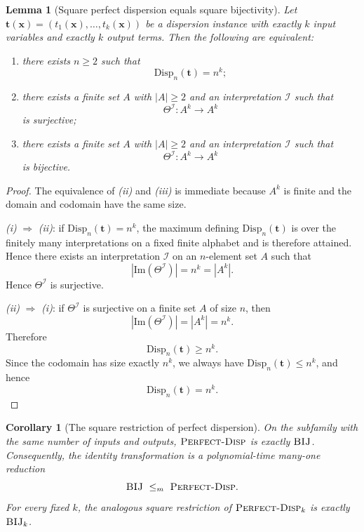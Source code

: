 \documentclass[11pt]{article}
\theoremstyle{definition}
\theoremstyle{plain}
\newtheorem{lemma}[definition]{Lemma}
\newtheorem{corollary}[definition]{Corollary}
\newcommand{\Img}{\mathrm{Im}}
\newcommand{\Disp}{\mathrm{Disp}}
\begin{document}
\begin{lemma}[Square perfect dispersion equals square bijectivity]
\label{lem:square-perfect-equals-bij}
Let $\mathbf t(\mathbf x)=(t_1(\mathbf x),\dots,t_k(\mathbf x))$ be a dispersion instance with exactly $k$ input
variables and exactly $k$ output terms.
Then the following are equivalent:
\begin{enumerate}[label=\textit{(\roman*)}, leftmargin=*]
\item there exists $n\ge 2$ such that
\[
\Disp_n(\mathbf t)=n^k;
\]
\item there exists a finite set $A$ with $|A|\ge 2$ and an interpretation $\mathcal I$ such that
\[
\Theta^\mathcal I:A^k\to A^k
\]
is surjective;
\item there exists a finite set $A$ with $|A|\ge 2$ and an interpretation $\mathcal I$ such that
\[
\Theta^\mathcal I:A^k\to A^k
\]
is bijective.
\end{enumerate}
\end{lemma}

\begin{proof}
The equivalence of \textit{(ii)} and \textit{(iii)} is immediate because $A^k$ is finite and the domain and codomain
have the same size.

\textit{(i)} $\Rightarrow$ \textit{(ii)}:
if $\Disp_n(\mathbf t)=n^k$, the maximum defining $\Disp_n(\mathbf t)$ is over the finitely many
interpretations on a fixed finite alphabet and is therefore attained.  Hence there exists an interpretation
$\mathcal I$ on an $n$-element set
$A$ such that
\[
|\Img(\Theta^\mathcal I)|=n^k=|A^k|.
\]
Hence $\Theta^\mathcal I$ is surjective.

\textit{(ii)} $\Rightarrow$ \textit{(i)}:
if $\Theta^\mathcal I$ is surjective on a finite set $A$ of size $n$, then
\[
|\Img(\Theta^\mathcal I)|=|A^k|=n^k.
\]
Therefore
\[
\Disp_n(\mathbf t)\ge n^k.
\]
Since the codomain has size exactly $n^k$, we always have $\Disp_n(\mathbf t)\le n^k$, and hence
\[
\Disp_n(\mathbf t)=n^k.
\]
\end{proof}

\begin{corollary}[The square restriction of perfect dispersion]
\label{cor:bij-reduces-perfect}
On the subfamily with the same number of inputs and outputs,
$\textsc{Perfect-Disp}$ is exactly $\textsc{BIJ}$.  Consequently, the identity transformation is a
polynomial-time many-one reduction
\[
\textsc{BIJ}\ \le_m\ \textsc{Perfect-Disp}.
\]
For every fixed $k$, the analogous square restriction of
$\textsc{Perfect-Disp}_k$ is exactly $\textsc{BIJ}_k$.
\end{corollary}
\end{document}
